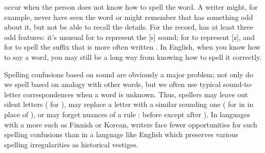 




occur when the person does not know how to spell the word.
A writer might, for example, never have seen the word
 or might remember that  has
something odd about it, but not be able to recall the details.  For
the record,  has at least three odd features: it's unusual for  to represent the {[s]} sound; for   to represent {[z]}, and for  to spell the suffix that is more often written .
In
English, when you know how to say a word, you may still be a long way
from knowing how to spell it correctly.

Spelling confusions based on sound are obviously a major problem; not
only do we spell based on analogy with other words, but we often use
typical sound-to-letter correspondences when a word is unknown.  Thus,
spellers may leave out silent letters ( for
), may replace a letter with a similar sounding one
( for  in  in place of
), or may forget nuances of a rule :
 before  except after ). In languages with a more  such as Finnish or Korean, writers face fewer opportunities for such spelling confusions than in a language like English which preserves various spelling irregularities as historical vestiges.

